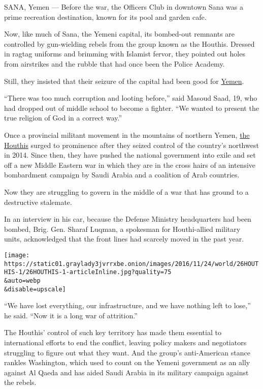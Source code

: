 SANA, Yemen --- Before the war, the Officers Club in downtown Sana was a
prime recreation destination, known for its pool and garden cafe.

Now, like much of Sana, the Yemeni capital, its bombed-out remnants are
controlled by gun-wielding rebels from the group known as the Houthis.
Dressed in ragtag uniforms and brimming with Islamist fervor, they
pointed out holes from airstrikes and the rubble that had once been the
Police Academy.

Still, they insisted that their seizure of the capital had been good for
\href{http://www.nytimes3xbfgragh.onion/topic/destination/yemen}{Yemen}.

``There was too much corruption and looting before,'' said Masoud Saad,
19, who had dropped out of middle school to become a fighter. ``We
wanted to present the true religion of God in a correct way.''

Once a provincial militant movement in the mountains of northern Yemen,
\href{http://www.nytimes3xbfgragh.onion/2015/01/21/world/middleeast/who-are-the-houthis-of-yemen.html}{the
Houthis} surged to prominence after they seized control of the country's
northwest in 2014. Since then, they have pushed the national government
into exile and set off a new Middle Eastern war in which they are in the
cross hairs of an intensive bombardment campaign by Saudi Arabia and a
coalition of Arab countries.

Now they are struggling to govern in the middle of a war that has ground
to a destructive stalemate.

In an interview in his car, because the Defense Ministry headquarters
had been bombed, Brig. Gen. Sharaf Luqman, a spokesman for Houthi-allied
military units, acknowledged that the front lines had scarcely moved in
the past year.

\texttt{[image: https://static01.graylady3jvrrxbe.onion/images/2016/11/24/world/26HOUTHIS-1/26HOUTHIS-1-articleInline.jpg?quality=75\\\&auto=webp\\\&disable=upscale]}

``We have lost everything, our infrastructure, and we have nothing left
to lose,'' he said. ``Now it is a long war of attrition.''

The Houthis' control of such key territory has made them essential to
international efforts to end the conflict, leaving policy makers and
negotiators struggling to figure out what they want. And the group's
anti-American stance rankles Washington, which used to count on the
Yemeni government as an ally against Al Qaeda and has aided Saudi Arabia
in its military campaign against the rebels.

